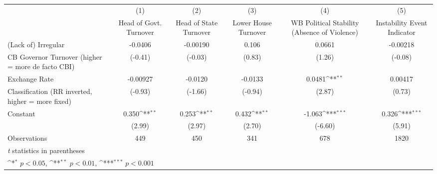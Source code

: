 {
\def\sym#1{\ifmmode^{#1}\else\(^{#1}\)\fi}
\begin{tabular}{l*{5}{c}}
\hline\hline
                    &\multicolumn{1}{c}{(1)}&\multicolumn{1}{c}{(2)}&\multicolumn{1}{c}{(3)}&\multicolumn{1}{c}{(4)}&\multicolumn{1}{c}{(5)}\\
                    &\multicolumn{1}{c}{Head of Govt. Turnover}&\multicolumn{1}{c}{Head of State Turnover}&\multicolumn{1}{c}{Lower House Turnover}&\multicolumn{1}{c}{WB Political Stability (Absence of Violence)}&\multicolumn{1}{c}{Instability Event Indicator}\\
\hline
(Lack of) Irregular &     -0.0406         &    -0.00190         &       0.106         &      0.0661         &    -0.00218         \\
CB Governor Turnover (higher = more de facto CBI)&     (-0.41)         &     (-0.03)         &      (0.83)         &      (1.26)         &     (-0.08)         \\
[1em]
Exchange Rate       &    -0.00927         &     -0.0120         &     -0.0133         &      0.0481\sym{**} &     0.00417         \\
Classification (RR inverted, higher = more fixed)&     (-0.93)         &     (-1.66)         &     (-0.94)         &      (2.87)         &      (0.73)         \\
[1em]
Constant            &       0.350\sym{**} &       0.253\sym{**} &       0.432\sym{**} &      -1.063\sym{***}&       0.326\sym{***}\\
                    &      (2.99)         &      (2.97)         &      (2.70)         &     (-6.60)         &      (5.91)         \\
\hline
Observations        &         449         &         450         &         341         &         678         &        1820         \\
\hline\hline
\multicolumn{6}{l}{\footnotesize \textit{t} statistics in parentheses}\\
\multicolumn{6}{l}{\footnotesize \sym{*} \(p<0.05\), \sym{**} \(p<0.01\), \sym{***} \(p<0.001\)}\\
\end{tabular}
}
